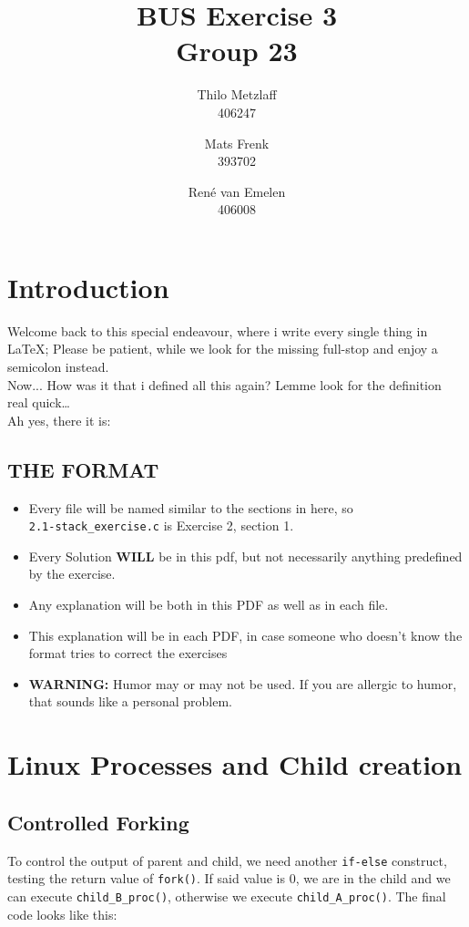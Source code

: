 \documentclass[a4paper, 11pt]{article}
\author{Thilo Metzlaff\\406247 \and Mats Frenk\\393702\and René van Emelen\\406008}
\title{BUS Exercise 3 \\ Group 23}
\begin{document}
    \maketitle
    \newpage

    \tableofcontents
    \newpage

    \section*{Introduction}
    Welcome back to this special endeavour, where i write every single thing in \LaTeX{}; Please be patient, while we look for the missing full-stop and enjoy a semicolon instead.\\
    Now... How was it that i defined all this again? Lemme look for the definition real quick\dots\\
    Ah yes, there it is:

    \subsection*{THE FORMAT}
    \begin{itemize}
        \item Every file will be named similar to the sections in here, so\\
              \texttt{2.1-stack\_exercise.c} is Exercise 2, section 1.
        \item Every Solution \textbf{WILL} be in this pdf, but not necessarily 
              anything predefined by the exercise.
        \item Any explanation will be both in this PDF as well as in each file.
        \item This explanation will be in each PDF, in case someone who doesn't
              know the format tries to correct the exercises
        \item \textbf{WARNING:} Humor may or may not be used. If you are allergic
              to humor, that sounds like a personal problem.
    \end{itemize}
    \newpage

    \section{Linux Processes and Child creation}
    
    \subsection{Controlled Forking}
    To control the output of parent and child, we need another \texttt{if-else} construct, testing the return value of \texttt{fork()}. If said value is 0, 
    we are in the child and we can execute \texttt{child\_B\_proc()}, otherwise we execute \texttt{child\_A\_proc()}. The final code looks like this:\\
    
    \newpage
    
\end{document}
